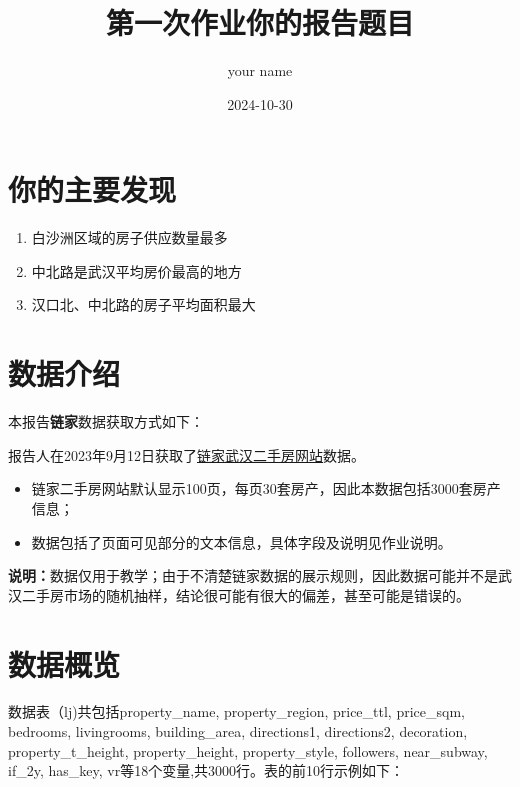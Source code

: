 \documentclass[
]{article}
\title{第一次作业你的报告题目}
\author{your name}
\date{2024-10-30}
\begin{document}
\maketitle

\section{你的主要发现}\label{ux4f60ux7684ux4e3bux8981ux53d1ux73b0}

\begin{enumerate}
\def\labelenumi{\arabic{enumi}.}
\item
  白沙洲区域的房子供应数量最多
\item
  中北路是武汉平均房价最高的地方
\item
  汉口北、中北路的房子平均面积最大
\end{enumerate}

\section{数据介绍}\label{ux6570ux636eux4ecbux7ecd}

本报告\textbf{链家}数据获取方式如下：

报告人在2023年9月12日获取了\href{https://wh.lianjia.com/ershoufang/}{链家武汉二手房网站}数据。

\begin{itemize}
\item
  链家二手房网站默认显示100页，每页30套房产，因此本数据包括3000套房产信息；
\item
  数据包括了页面可见部分的文本信息，具体字段及说明见作业说明。
\end{itemize}

\textbf{说明：}数据仅用于教学；由于不清楚链家数据的展示规则，因此数据可能并不是武汉二手房市场的随机抽样，结论很可能有很大的偏差，甚至可能是错误的。

\section{数据概览}\label{ux6570ux636eux6982ux89c8}

数据表（lj)共包括property\_name, property\_region, price\_ttl,
price\_sqm, bedrooms, livingrooms, building\_area, directions1,
directions2, decoration, property\_t\_height, property\_height,
property\_style, followers, near\_subway, if\_2y, has\_key,
vr等18个变量,共3000行。表的前10行示例如下：
\end{document}
